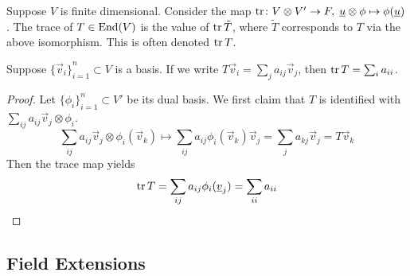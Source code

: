 \begin{definition}
    Suppose \(V\) is finite dimensional.
    Consider the map \(\tr\colon V \otimes V'\to F,\;\underline{u}\otimes\phi\mapsto\phi(\underline{u})\).
    The trace of \(T \in \operatorname{End}(V)\) is the value of \(\tr\tilde{T}\),
    where \(\tilde{T}\) corresponds to \(T\) via the above isomorphism.
    This is often denoted \(\tr T\).
\end{definition}
\begin{proposition}
    Suppose \({\{\vec{v}_i\}}_{i=1}^n \subset V\) is a basis.
    If we write \(T\vec{v}_i = \sum_j a_{ij}\vec{v}_j\),
    then \(\tr T = \sum_i a_{ii}\).
\end{proposition}
\begin{proof}
    Let \({\{\phi_i\}}_{i=1}^n \subset V'\) be its dual basis.
    We first claim that \(T\) is identified with \(\sum_{ij} a_{ij}\vec{v}_j\otimes\phi_i\).
    \begin{equation*}
        \sum_{ij} a_{ij}\vec{v}_j\otimes\phi_i(\vec{v}_k)
        \mapsto \sum_{ij} a_{ij}\phi_i(\vec{v}_k)\vec{v}_j
        = \sum_j a_{kj}\vec{v}_j = T\vec{v}_k
    \end{equation*}
    Then the trace map yields
    \begin{equation*}
        \tr T = \sum_{ij} a_{ij} \phi_i(\underline{v}_j) = \sum_{ii} a_{ii}
    \end{equation*}
\end{proof}

\subsection*{Field Extensions}

